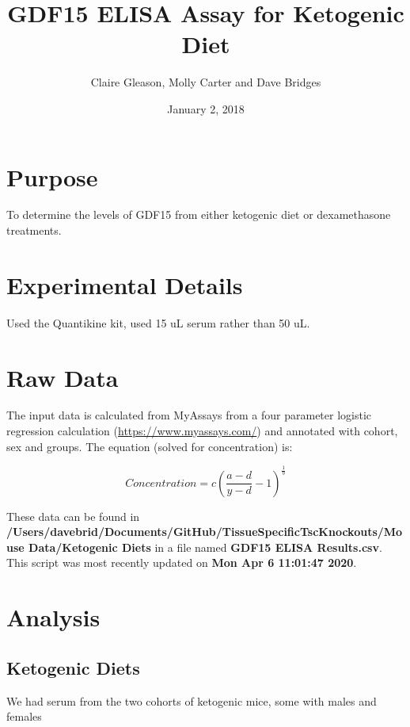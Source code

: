 \documentclass[]{article}
\title{GDF15 ELISA Assay for Ketogenic Diet}
\author{Claire Gleason, Molly Carter and Dave Bridges}
\date{January 2, 2018}
\begin{document}
\maketitle

{
\setcounter{tocdepth}{2}
\tableofcontents
}
\hypertarget{purpose}{%
\section{Purpose}\label{purpose}}

To determine the levels of GDF15 from either ketogenic diet or
dexamethasone treatments.

\hypertarget{experimental-details}{%
\section{Experimental Details}\label{experimental-details}}

Used the Quantikine kit, used 15 uL serum rather than 50 uL.

\hypertarget{raw-data}{%
\section{Raw Data}\label{raw-data}}

The input data is calculated from MyAssays from a four parameter
logistic regression calculation (\url{https://www.myassays.com/}) and
annotated with cohort, sex and groups. The equation (solved for
concentration) is:

\[ Concentration = c\left ( \frac{a-d}{y-d} -1 \right )^{\frac{1}{b}} \]

These data can be found in
\textbf{/Users/davebrid/Documents/GitHub/TissueSpecificTscKnockouts/Mouse
Data/Ketogenic Diets} in a file named \textbf{GDF15 ELISA Results.csv}.
This script was most recently updated on \textbf{Mon Apr 6 11:01:47
2020}.

\hypertarget{analysis}{%
\section{Analysis}\label{analysis}}

\hypertarget{ketogenic-diets}{%
\subsection{Ketogenic Diets}\label{ketogenic-diets}}

We had serum from the two cohorts of ketogenic mice, some with males and
females
\end{document}
